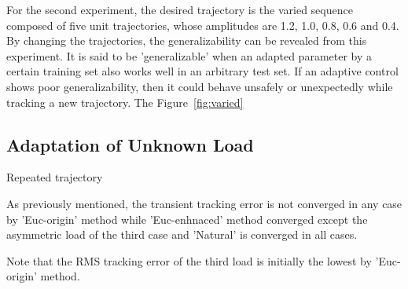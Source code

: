 \documentclass[letterpaper, 10 pt, conference]{ieeeconf}  %
\begin{document}
For the second experiment, the desired trajectory is the varied sequence composed of five unit trajectories, whose amplitudes are 1.2, 1.0, 0.8, 0.6 and 0.4. By changing the trajectories, the generalizability can be revealed from this experiment. It is said to be 'generalizable' when an adapted parameter by a certain training set also works well in an arbitrary test set. If an adaptive control shows poor generalizability, then it could behave unsafely or unexpectedly while tracking a new trajectory. The Figure~\ref{fig:varied}



\subsection{Adaptation of Unknown Load} \label{section:EFonly}
Repeated trajectory

As previously mentioned, the transient tracking error is not converged in any case by 'Euc-origin' method while 'Euc-enhnaced' method converged except the asymmetric load of the third case and 'Natural' is converged in all cases. 

Note that the RMS tracking error of the third load is initially the lowest by 'Euc-origin' method.



\end{document}
